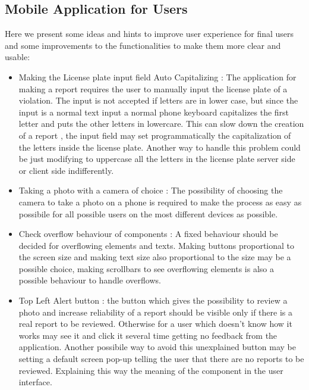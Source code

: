 \subsection{Mobile Application for Users}
Here we present some ideas and hints to improve user experience for final users and some improvements to the functionalities to make them more clear and usable:
\begin{itemize}
\item Making the License plate input field Auto Capitalizing : The application for making a report requires the user to manually input the license plate of a violation. The input is not accepted if letters are in lower case, but since the input is a normal text input a normal phone keyboard capitalizes the first letter and puts the other letters in lowercare. This can slow down the creation of a report , the input field may set programmatically the capitalization of the letters inside the license plate. Another way to handle this problem could be just modifying to uppercase all the letters in the license plate server side or client side indifferently.
\item Taking a photo with a camera of choice : The possibility of choosing the camera to take a photo on a phone is required to make the process as easy as possibile for all possible users on the most different devices as possible. 
\item Check overflow behaviour of components : A fixed behaviour should be decided for overflowing elements and texts. Making buttons proportional to the screen size and making text size also proportional to the size may be a possible choice, making scrollbars to see overflowing elements is also a possible behaviour to handle overflows.
\item Top Left Alert button : the button which gives the possibility to review a photo and increase reliability of a report should be visible only if there is a real report to be reviewed. Otherwise for a user which doesn't know how it works may see it and click it several time getting no feedback from the application. Another possibile way to avoid this unexplained button may be setting a default screen pop-up telling the user that there are no reports to be reviewed. Explaining this way the meaning of the component in the user interface.

\end{itemize}
